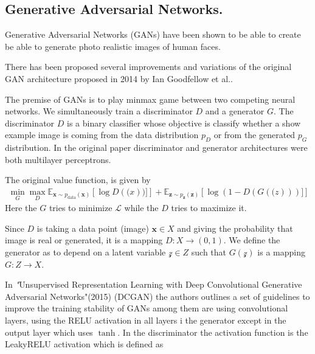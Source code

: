 






\subsection{Generative Adversarial Networks.}

Generative Adversarial Networks (GANs) have been shown to be able to create be able to generate photo realistic images of human faces.\cite{progan}

There has been proposed several improvements and variations of the original GAN architecture proposed in 2014 by Ian Goodfellow et al.\cite{gan}.

The premise of GANs is to play minmax game between two competing neural networks. We simultaneously train a discriminator $D$ and a generator $G$.
The discriminator $D$ is a binary classifier whose objective is classify whether a show example image is coming from the data distribution $p_D$ or from the generated $p_G$ distribution. In the original paper discriminator and generator architectures were both multilayer perceptrons.

The original value function, is given by
\begin{align}
\min_G \max_D \mathbb{E}_{\mathbf{x}\sim p_{\text{data}}(\mathbf{x})}
\left[\log D(\mathbf(x))]\right]+
\mathbb{E}_{\mathbf{z}\sim p_{\mathbf{z}}(\mathbf{z})}
\left[\log (1-D(G(\mathbf(z)))]\right]
\end{align}
Here the $G$ tries to minimize $\mathcal{L}$ while the $D$ tries to maximize it.

Since $D$ is taking a data point (image) $\mathbf{x}\in X$ and giving the probability that image is real or generated, it is a mapping $D:X \to (0,1)$. We define the generator as to depend on a latent variable $\mathcal{z}\in Z$ such that $G(\mathcal{z})$ is a mapping $G:Z\to X$.

In \textit"{Unsupervised Representation Learning with Deep Convolutional Generative Adversarial Networks"}(2015) (DCGAN)\cite{dcgan} the authors outlines a set of guidelines to improve the training stability of GANs among them are using convolutional layers, using the RELU activation in all layers i the generator except in the output layer which uses $\tanh$. In the discriminator the activation function is  the LeakyRELU activation which is defined as

